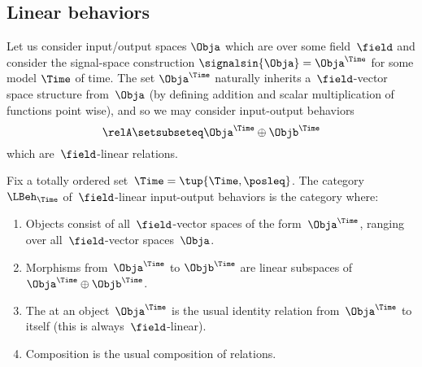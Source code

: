 



\subsection{Linear behaviors}

Let us consider input/output spaces $\Obja$ which are  over some field~$\field$ and consider the signal-space construction $\signalsin{\Obja} = \Obja^\Time$ for some model $\Time$ of time.
The set $\Obja^\Time$ naturally inherits a~$\field$-vector space structure from~$\Obja$ (by defining addition and scalar multiplication of functions point wise), and so we may consider input-output behaviors
\begin{equation}
    \relA \setsubseteq \Obja^\Time \oplus \Objb^\Time
\end{equation}
which are~$\field$-linear relations.

\begin{definition}\label{def:linear-io-behavior}
    Fix a totally ordered set~$\Time = \tup{\Time, \posleq}$.
    The category~$\LBeh_\Time$ of~$\field$-linear input-output behaviors is the category where:
    \begin{enumerate}
        \item Objects consist of all~$\field$-vector spaces of the form~$\Obja^\Time$, ranging over all~$\field$-vector spaces~$\Obja$.
        \item Morphisms from~$\Obja^\Time$ to $\Objb^\Time$ are linear subspaces of~$\Obja^\Time \oplus \Objb^\Time$.
        \item The  at an object~$\Obja^\Time$ is the usual identity relation from~$\Obja^\Time$ to itself (this is always~$\field$-linear).
        \item Composition is the usual composition of relations.
    \end{enumerate}
\end{definition}

